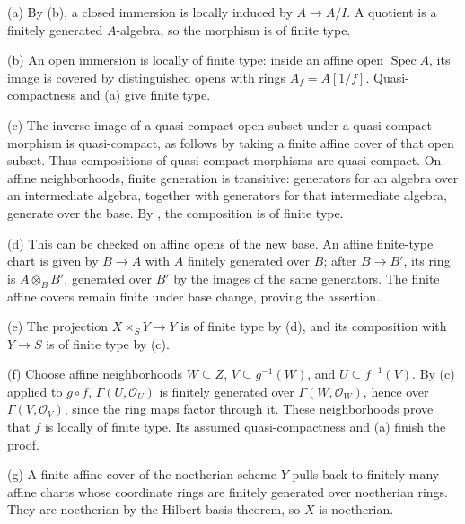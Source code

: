 (a) By (b), a closed immersion is locally induced by $A\to A/I$. A quotient is a finitely generated $A$-algebra, so the morphism is of finite type.

(b) An open immersion is locally of finite type: inside an affine open $\operatorname{Spec}A$, its image is covered by distinguished opens with rings $A_f=A[1/f]$. Quasi-compactness and (a) give finite type.

(c) The inverse image of a quasi-compact open subset under a quasi-compact morphism is quasi-compact, as follows by taking a finite affine cover of that open subset. Thus compositions of quasi-compact morphisms are quasi-compact. On affine neighborhoods, finite generation is transitive: generators for an algebra over an intermediate algebra, together with generators for that intermediate algebra, generate over the base. By , the composition is of finite type.

(d) This can be checked on affine opens of the new base. An affine finite-type chart is given by $B\to A$ with $A$ finitely generated over $B$; after $B\to B'$, its ring is $A\otimes_BB'$, generated over $B'$ by the images of the same generators. The finite affine covers remain finite under base change, proving the assertion.

(e) The projection $X\times_SY\to Y$ is of finite type by (d), and its composition with $Y\to S$ is of finite type by (c).

(f) Choose affine neighborhoods $W\subseteq Z$, $V\subseteq g^{-1}(W)$, and $U\subseteq f^{-1}(V)$. By (c) applied to $g\circ f$, $\Gamma(U,\mathcal O_U)$ is finitely generated over $\Gamma(W,\mathcal O_W)$, hence over $\Gamma(V,\mathcal O_V)$, since the ring maps factor through it. These neighborhoods prove that $f$ is locally of finite type. Its assumed quasi-compactness and (a) finish the proof.

(g) A finite affine cover of the noetherian scheme $Y$ pulls back to finitely many affine charts whose coordinate rings are finitely generated over noetherian rings. They are noetherian by the Hilbert basis theorem, so $X$ is noetherian.
